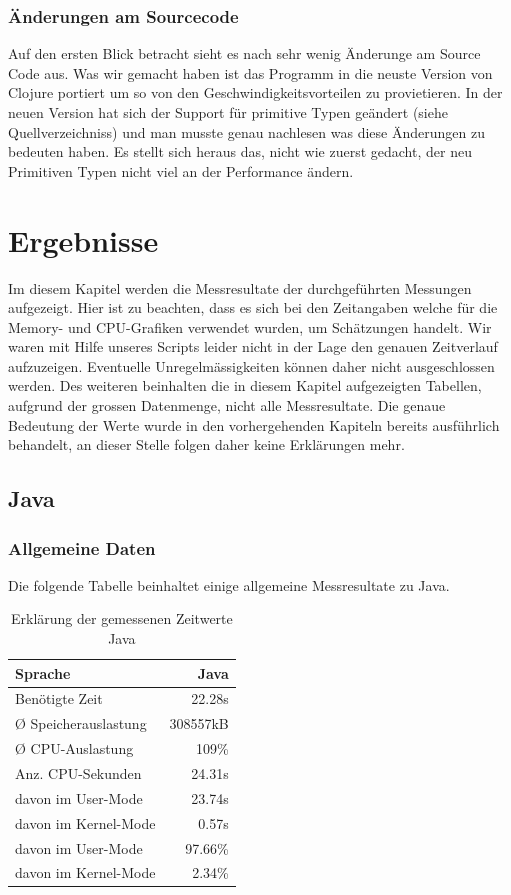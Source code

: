 \documentclass{fancydocument}
\begin{document}
\subsubsection{\"Anderungen am Sourcecode}

Auf den ersten Blick betracht sieht es nach sehr wenig \"Anderunge am
Source Code aus. Was wir gemacht haben ist das Programm in die neuste
Version von Clojure portiert um so von den Geschwindigkeitsvorteilen
zu provietieren. In der neuen Version hat sich der Support f\"ur
primitive Typen ge\"andert (siehe Quellverzeichniss) und man musste
genau nachlesen was diese \"Anderungen zu bedeuten haben. Es stellt
sich heraus das, nicht wie zuerst gedacht, der neu Primitiven Typen
nicht viel an der Performance \"andern.

\section{Ergebnisse}
Im diesem Kapitel werden die Messresultate der durchgeführten Messungen aufgezeigt. Hier ist zu beachten, dass es sich bei den Zeitangaben welche für die Memory- und CPU-Grafiken verwendet wurden, um Schätzungen handelt. Wir waren mit Hilfe unseres Scripts leider nicht in der Lage den genauen Zeitverlauf aufzuzeigen. Eventuelle Unregelmässigkeiten können daher nicht ausgeschlossen werden. Des weiteren beinhalten die in diesem Kapitel aufgezeigten Tabellen, aufgrund der grossen Datenmenge, nicht alle Messresultate. Die genaue Bedeutung der Werte wurde in den vorhergehenden Kapiteln bereits ausführlich behandelt, an dieser Stelle folgen daher keine Erklärungen mehr.

\subsection{Java}
\subsubsection{Allgemeine Daten}
Die folgende Tabelle beinhaltet einige allgemeine Messresultate zu Java. 
\begin{table}[h!]
\centering
\begin{tabular}{|p{6cm}|r|} \hline
Sprache & Java\\
\hline
Benötigte Zeit & 22.28s\\
\hline
Ø Speicherauslastung & 308557kB\\
\hline
Ø CPU-Auslastung & 109\%\\
\hline
Anz. CPU-Sekunden & 24.31s\\
\hline
davon im User-Mode & 23.74s\\
\hline
davon im Kernel-Mode & 0.57s\\
\hline
davon im User-Mode & 97.66\%\\
\hline
davon im Kernel-Mode & 2.34\%\\
\hline
\end{tabular}
\caption{Erklärung der gemessenen Zeitwerte Java}
\end{table}
\end{document}
